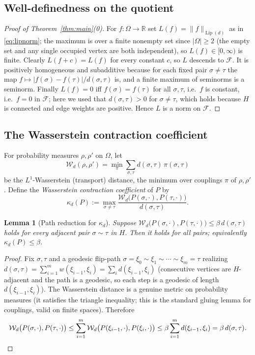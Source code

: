 \documentclass{amsart}
\newtheorem{lemma}{Lemma}
\DeclareMathOperator{\Lip}{Lip}
\newcommand{\Om}{\Omega}
\newcommand{\R}{\mathbb{R}}
\newcommand{\Wd}{\mathcal{W}_d}
\begin{document}
\subsection{Well-definedness on the quotient}
\begin{proof}[Proof of Theorem~\ref{thm:main}(0)]
For $f:\Om\to\R$ set $L(f)=\|f\|_{\Lip(d)}$ as in \eqref{eq:lipnorm}; the maximum
is over a finite nonempty set since $|\Om|\ge2$ (the empty set and any single
occupied vertex are both independent), so $L(f)\in[0,\infty)$ is finite. Clearly
$L(f+c)=L(f)$ for every constant $c$, so $L$ descends to $\mathcal F$.
It is positively homogeneous and subadditive because for each fixed pair
$\sigma\neq\tau$ the map $f\mapsto|f(\sigma)-f(\tau)|/d(\sigma,\tau)$ is, and a
finite maximum of seminorms is a seminorm. Finally $L(f)=0$ iff
$f(\sigma)=f(\tau)$ for all $\sigma,\tau$, i.e.\ $f$ is constant, i.e.\ $f=0$ in
$\mathcal F$; here we used that $d(\sigma,\tau)>0$ for $\sigma\neq\tau$, which
holds because $H$ is connected and edge weights are positive. Hence $L$ is a norm
on $\mathcal F$.
\end{proof}

\subsection{The Wasserstein contraction coefficient}
For probability measures $\rho,\rho'$ on $\Om$, let
\[
\Wd(\rho,\rho')=\min_{\pi}\sum_{\sigma,\tau}d(\sigma,\tau)\,\pi(\sigma,\tau)
\]
be the $L^1$-Wasserstein (transport) distance, the minimum over couplings
$\pi$ of $\rho,\rho'$. Define the \emph{Wasserstein contraction coefficient}
of $P$ by
\begin{equation}\label{eq:kappa}
\kappa_d(P):=\max_{\sigma\neq\tau}\frac{\Wd\big(P(\sigma,\cdot),P(\tau,\cdot)\big)}{d(\sigma,\tau)} .
\end{equation}

\begin{lemma}[Path reduction for $\kappa_d$]\label{lem:pathreduction}
Suppose $\Wd\big(P(\sigma,\cdot),P(\tau,\cdot)\big)\le\beta\,d(\sigma,\tau)$
holds for every adjacent pair $\sigma\sim\tau$ in $H$. Then it holds for all
pairs; equivalently $\kappa_d(P)\le\beta$.
\end{lemma}
\begin{proof}
Fix $\sigma,\tau$ and a geodesic flip-path
$\sigma=\xi_0\sim\xi_1\sim\cdots\sim\xi_m=\tau$ realizing
$d(\sigma,\tau)=\sum_{i=1}^m w(\xi_{i-1},\xi_i)=\sum_i d(\xi_{i-1},\xi_i)$
(consecutive vertices are $H$-adjacent and the path is a geodesic, so each step
is a geodesic of length $d(\xi_{i-1},\xi_i)$). The Wasserstein distance is a
genuine metric on probability measures (it satisfies the triangle inequality;
this is the standard gluing lemma for couplings, valid on finite spaces).
Therefore
\[
\Wd\big(P(\sigma,\cdot),P(\tau,\cdot)\big)
\le\sum_{i=1}^m \Wd\big(P(\xi_{i-1},\cdot),P(\xi_i,\cdot)\big)
\le\beta\sum_{i=1}^m d(\xi_{i-1},\xi_i)=\beta\,d(\sigma,\tau). \qedhere
\]
\end{proof}
\end{document}
